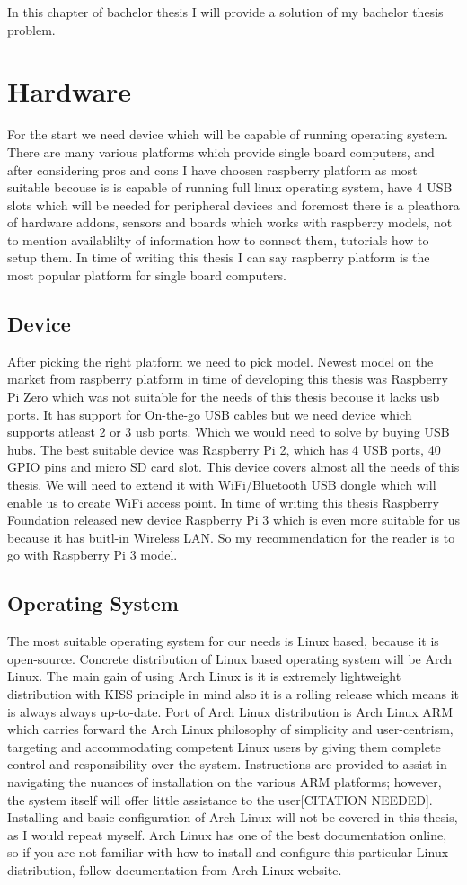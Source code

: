 In this chapter of bachelor thesis I will provide a solution of my bachelor thesis problem.
\section{Hardware}
For the start we need device which will be capable of running operating system. There are many various platforms which provide single board computers, and after considering pros and cons I have choosen raspberry platform as most suitable becouse is is capable of running full linux operating system, have 4 USB slots which will be needed for peripheral devices and foremost there is a pleathora of hardware addons, sensors and boards which works with raspberry models, not to mention availablilty of information how to connect them, tutorials how to setup them. In time of writing this thesis I can say raspberry platform is the most popular platform for single board computers.
\subsection{Device}
After picking the right platform we need to pick model. Newest model on the market from raspberry platform in time of developing this thesis was Raspberry Pi Zero which was not suitable for the needs of this thesis becouse it lacks usb ports. It has support for On-the-go USB cables but we need device which supports atleast 2 or 3 usb ports. Which we would need to solve by buying USB hubs. The best suitable device was Raspberry Pi 2, which has 4 USB ports, 40 GPIO pins and micro SD card slot. This device covers almost all the needs of this thesis. We will need to extend it with WiFi/Bluetooth USB dongle which will enable us to create WiFi access point. In time of writing this thesis Raspberry Foundation released new device Raspberry Pi 3 which is even more suitable for us because it has buitl-in Wireless LAN. So my recommendation for the reader is to go with Raspberry Pi 3 model.
\subsection{Operating System}
The most suitable operating system for our needs is Linux based, because it is open-source. Concrete distribution of Linux based operating system will be Arch Linux. The main gain of using Arch Linux is it is extremely lightweight distribution with KISS principle in mind also it is a rolling release which means it is always always up-to-date. Port of Arch Linux distribution is Arch Linux ARM which carries forward the Arch Linux philosophy of simplicity and user-centrism, targeting and accommodating competent Linux users by giving them complete control and responsibility over the system. Instructions are provided to assist in navigating the nuances of installation on the various ARM platforms; however, the system itself will offer little assistance to the user[CITATION NEEDED].
Installing and basic configuration of Arch Linux will not be covered in this thesis, as I would repeat myself. Arch Linux has one of the best documentation online, so if you are not familiar with how to install and configure this particular Linux distribution, follow documentation from Arch Linux website.
\newpage
